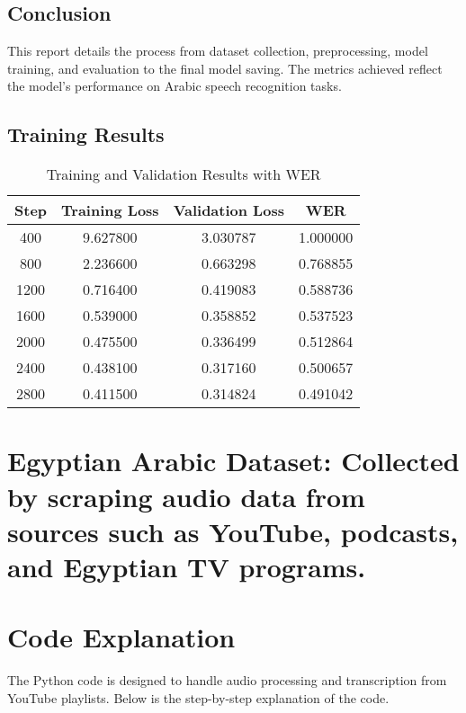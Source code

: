 \documentclass[a4paper,12pt]{article}
\begin{document}
\subsection*{Conclusion}

This report details the process from dataset collection, preprocessing, model training, and evaluation to the final model saving. The metrics achieved reflect the model's performance on Arabic speech recognition tasks.

\subsection*{Training Results}

\begin{table}[h]
    \centering
    \begin{tabular}{cccc}
        \toprule
        Step & Training Loss & Validation Loss & WER \\ 
        \midrule
        400 & 9.627800 & 3.030787 & 1.000000 \\ 
        800 & 2.236600 & 0.663298 & 0.768855 \\ 
        1200 & 0.716400 & 0.419083 & 0.588736 \\ 
        1600 & 0.539000 & 0.358852 & 0.537523 \\ 
        2000 & 0.475500 & 0.336499 & 0.512864 \\ 
        2400 & 0.438100 & 0.317160 & 0.500657 \\ 
        2800 & 0.411500 & 0.314824 & 0.491042 \\ 
        \bottomrule
    \end{tabular}
    \caption{Training and Validation Results with WER}
    \label{tab:training_results}
\end{table}

\section*{Egyptian Arabic Dataset: Collected by scraping audio data from sources such as YouTube, podcasts, and Egyptian TV programs.}

\section*{Code Explanation}

The Python code is designed to handle audio processing and transcription from YouTube playlists. Below is the step-by-step explanation of the code.
\newline
\newline
\newline
\end{document}
